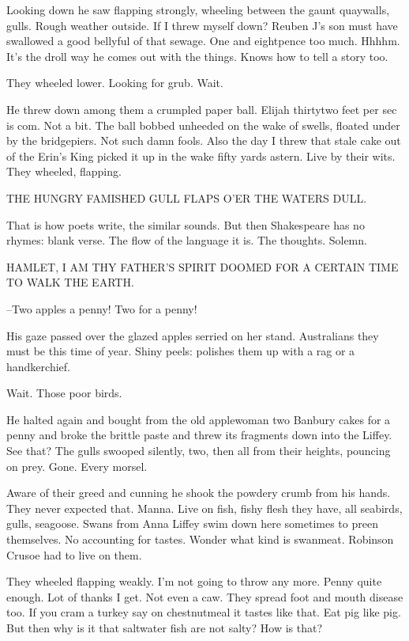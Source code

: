 Looking down he saw flapping strongly, wheeling between the gaunt
quaywalls, gulls. Rough weather outside. If I threw myself down?
Reuben J's son must have swallowed a good bellyful of that sewage. One and
eightpence too much. Hhhhm. It's the droll way he comes out with the
things. Knows how to tell a story too.

They wheeled lower. Looking for grub. Wait.

He threw down among them a crumpled paper ball. Elijah thirtytwo
feet per sec is com. Not a bit. The ball bobbed unheeded on the wake of
swells, floated under by the bridgepiers. Not such damn fools. Also the
day I threw that stale cake out of the Erin's King picked it up in the
wake fifty yards astern. Live by their wits. They wheeled, flapping.

    THE HUNGRY FAMISHED GULL
    FLAPS O'ER THE WATERS DULL.


That is how poets write, the similar sounds. But then Shakespeare has
no rhymes: blank verse. The flow of the language it is. The thoughts.
Solemn.


    HAMLET, I AM THY FATHER'S SPIRIT
    DOOMED FOR A CERTAIN TIME TO WALK THE EARTH.


--Two apples a penny! Two for a penny!

His gaze passed over the glazed apples serried on her stand.
Australians they must be this time of year. Shiny peels: polishes them up
with a rag or a handkerchief.

Wait. Those poor birds.

He halted again and bought from the old applewoman two Banbury
cakes for a penny and broke the brittle paste and threw its fragments down
into the Liffey. See that? The gulls swooped silently, two, then all from
their heights, pouncing on prey. Gone. Every morsel.

Aware of their greed and cunning he shook the powdery crumb from his
hands. They never expected that. Manna. Live on fish, fishy flesh
they have, all seabirds, gulls, seagoose. Swans from Anna Liffey swim
down here sometimes to preen themselves. No accounting for tastes.
Wonder what kind is swanmeat. Robinson Crusoe had to live on them.

They wheeled flapping weakly. I'm not going to throw any more.
Penny quite enough. Lot of thanks I get. Not even a caw. They spread foot
and mouth disease too. If you cram a turkey say on chestnutmeal it tastes
like that. Eat pig like pig. But then why is it that saltwater fish are
not salty? How is that?

